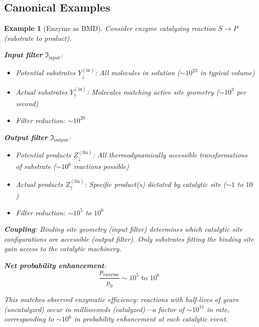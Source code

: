 \documentclass[12pt,a4paper]{article}
\newtheorem{example}{Example}
\begin{document}
\subsection{Canonical Examples}

\begin{example}[Enzyme as BMD]
\label{ex:enzyme_bmd}
Consider enzyme catalyzing reaction $S \to P$ (substrate to product).

\textbf{Input filter} $\Im_{\text{input}}$:
\begin{itemize}
\item Potential substrates $Y_{\downarrow}^{(\text{in})}$: All molecules in solution ($\sim 10^{23}$ in typical volume)
\item Actual substrates $Y_{\uparrow}^{(\text{in})}$: Molecules matching active site geometry ($\sim 10^3$ per second)
\item Filter reduction: $\sim 10^{20}$
\end{itemize}

\textbf{Output filter} $\Im_{\text{output}}$:
\begin{itemize}
\item Potential products $Z_{\downarrow}^{(\text{fin})}$: All thermodynamically accessible transformations of substrate ($\sim 10^6$ reactions possible)
\item Actual products $Z_{\uparrow}^{(\text{fin})}$: Specific product(s) dictated by catalytic site ($\sim 1$ to $10$)
\item Filter reduction: $\sim 10^5$ to $10^6$
\end{itemize}

\textbf{Coupling}: Binding site geometry (input filter) determines which catalytic site configurations are accessible (output filter). Only substrates fitting the binding site gain access to the catalytic machinery.

\textbf{Net probability enhancement}:
\begin{equation}
\frac{p_{\text{enzyme}}}{p_0} \sim 10^5 \text{ to } 10^6
\end{equation}

This matches observed enzymatic efficiency: reactions with half-lives of years (uncatalyzed) occur in milliseconds (catalyzed)—a factor of $\sim 10^{11}$ in rate, corresponding to $\sim 10^{6}$ in probability enhancement at each catalytic event.
\end{example}
\end{document}
